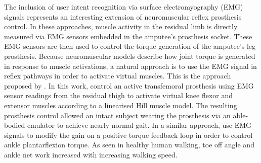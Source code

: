 The inclusion of user intent recognition via surface electromyography (EMG)
signals represents an interesting extension of neuromuscular reflex prosthesis
control. In these approaches, muscle activity in the residual limb is directly
measured via EMG sensors embedded in the amputee's prosthesis socket. These EMG
sensors are then used to control the torque generation of the amputee's leg
prosthesis. Because neuromuscular models describe how joint torque is generated
in response to muscle activations, a natural approach is to use the EMG signal
in reflex pathways in order to activate virtual muscles. This is the approach
proposed by \citet{wu2011electromyography}. In this work,
\citeauthor{wu2011electromyography} control an active transfemoral prosthesis
using EMG sensor readings from the residual thigh to activate virtual knee
flexor and extensor muscles according to a linearised Hill muscle model. The
resulting prosthesis control allowed an intact subject wearing the prosthesis
via an able-bodied emulator to achieve nearly normal gait. In a similar
approach, \citet{wang2013proportional} use EMG signals to modify the gain on a
positive torque feedback loop in order to control ankle plantarflexion torque.
As seen in healthy human walking, toe off angle and ankle net work increased
with increasing walking speed.
